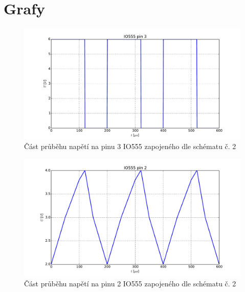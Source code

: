 \section{Grafy}
\setcounter{figure}{0}
  \renewcommand{\figurename}{Graf č.}
  
  \begin{figure}[H]
    \centering
    \includegraphics[width=13cm]{../img/g1.pdf}
    \caption{Část průběhu napětí na pinu 3 IO555 zapojeného dle schématu č. 2}
    \label{graf:1}
  \end{figure}
  
  \begin{figure}[H]
    \centering
    \includegraphics[width=13cm]{../img/g2.pdf}
    \caption{Část průběhu napětí na pinu 2 IO555 zapojeného dle schématu č. 2}
    \label{graf:2}
  \end{figure}
